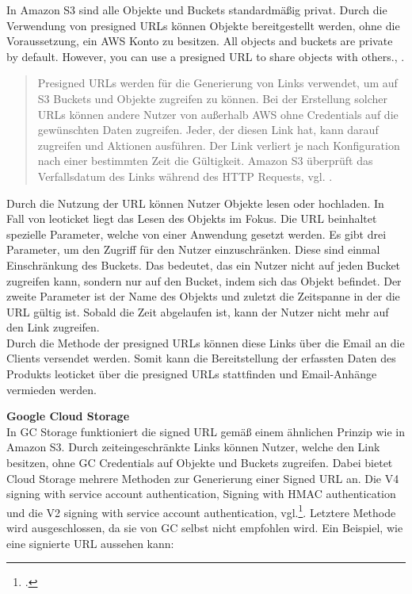 In Amazon S3 sind alle Objekte und Buckets standardmäßig privat. Durch die Verwendung von presigned URLs können Objekte bereitgestellt werden, ohne die Voraussetzung, ein AWS Konto zu besitzen. \glqq All objects and buckets are private by default. However, you can use a presigned URL to share objects with others.\grqq, \cite{aws-url}. 

\begin{quote}
	Presigned URLs werden für die Generierung von Links verwendet, um auf S3 Buckets und Objekte zugreifen zu können. Bei der Erstellung solcher URLs können andere Nutzer von außerhalb AWS ohne Credentials auf die gewünschten Daten zugreifen. Jeder, der diesen Link hat, kann darauf zugreifen und Aktionen ausführen. Der Link verliert je nach Konfiguration nach einer bestimmten Zeit die Gültigkeit. Amazon S3 überprüft das Verfallsdatum des Links während des HTTP Requests, vgl. \cite{aws-url}. 
\end{quote}

Durch die Nutzung der URL können Nutzer Objekte lesen oder hochladen. In Fall von leoticket liegt das Lesen des Objekts im Fokus. Die URL beinhaltet spezielle Parameter, welche von einer Anwendung gesetzt werden. Es gibt drei Parameter, um den Zugriff für den Nutzer einzuschränken. Diese sind einmal Einschränkung des Buckets. Das bedeutet, das ein Nutzer nicht auf jeden Bucket zugreifen kann, sondern nur auf den Bucket, indem sich das Objekt befindet. Der zweite Parameter ist der Name des Objekts und zuletzt die Zeitspanne in der die URL gültig ist. Sobald die Zeit abgelaufen ist, kann der Nutzer nicht mehr auf den Link zugreifen.\\

Durch die Methode der presigned URLs können diese Links über die Email an die Clients versendet werden. Somit kann die Bereitstellung der erfassten Daten des Produkts leoticket über die presigned URLs stattfinden und Email-Anhänge vermieden werden.

\newpage

\textbf{Google Cloud Storage}\\

In GC Storage funktioniert die signed URL gemäß einem ähnlichen Prinzip wie in Amazon S3. Durch zeiteingeschränkte Links können Nutzer, welche den Link besitzen, ohne GC Credentials auf Objekte und Buckets zugreifen. Dabei bietet Cloud Storage mehrere Methoden zur Generierung einer Signed URL an. Die V4 signing with service account authentication, Signing with HMAC authentication und die V2 signing with service account authentication, vgl.\footcite{gc-signedUrl}. Letztere Methode wird ausgeschlossen, da sie von GC selbst nicht empfohlen wird. Ein Beispiel, wie eine signierte URL aussehen kann:

